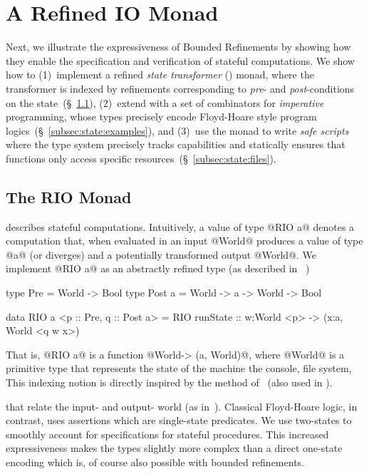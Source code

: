 \section{A Refined IO Monad}\label{sec:state}

Next, we illustrate the expressiveness of Bounded Refinements by 
showing how they enable the specification and verification of 
stateful computations. We show how to 
%
(1)~implement a refined \emph{state transformer} 
    (\RIO) monad, where the transformer is indexed by refinements 
    corresponding to \emph{pre}- and \emph{post}-conditions 
    on the state~(\S~\ref{subsec:state:definition}),
%
(2)~extend \RIO with a set of combinators for 
    \emph{imperative} programming, \ie whose types 
    precisely encode Floyd-Hoare style program 
    logics~(\S~\ref{subsec:state:examples}), and
%
(3)~use the \RIO monad to write \emph{safe scripts}
    where the type system precisely tracks capabilities
    and statically ensures that functions only access 
    specific resources~(\S~\ref{subsec:state:files}).

\subsection{The RIO Monad}
\label{subsec:state:definition}

 describes stateful computations.
Intuitively, a value of type @RIO a@ denotes a computation 
that, when evaluated in an input @World@ produces a value 
of type @a@ (or diverges) and a potentially transformed 
output @World@. We implement @RIO a@ as an abstractly
refined type (as described in ~\citep{vazou13})
%
%
\begin{code}
  type Pre    = World -> Bool 
  type Post a = World -> a -> World -> Bool 

  data RIO a <p :: Pre, q :: Post a> = RIO { 
    runState :: w:World <p> -> (x:a, World <q w x>) 
  }
\end{code}
%
That is, @RIO a@ is a function @World-> (a, World)@, where
@World@ is a primitive type that represents the state of 
the machine \ie the console, file system, \etc
%
This indexing notion is directly inspired by the method 
of~\citep{Filliatre98} (also used in \cite{ynot}).

that relate the input- and output- world (as in~\cite{ynot}). 
%
Classical Floyd-Hoare logic, in contrast,
uses assertions which are single-state 
predicates.
%
We use two-states to smoothly account for 
specifications for stateful procedures. 
This increased expressiveness makes the 
types slightly more complex than a direct
one-state encoding which is, of course 
also possible with bounded refinements.


